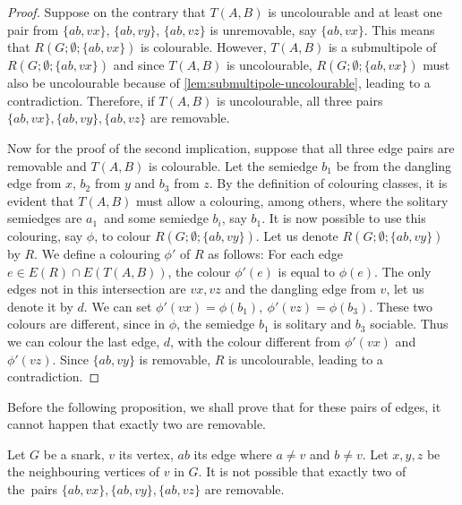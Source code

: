 \begin{proof}
	Suppose on the contrary that $T(A,B)$ is uncolourable and at least one pair from $\{ab,vx\}$, $\{ab,vy\}$, $\{ab,vz\}$ is unremovable, say $\{ab,vx\}$. This means that $R(G;\emptyset;\{ab,vx\})$ is colourable. However, $T(A,B)$ is a submultipole of $R(G;\emptyset;\{ab,vx\})$ and since $T(A,B)$ is uncolourable, $R(G;\emptyset;\{ab,vx\})$ must also be uncolourable because of \cref{lem:submultipole-uncolourable}, leading to a contradiction. Therefore, if $T(A,B)$ is uncolourable, all three pairs $\{ab,vx\}, \{ab,vy\}, \{ab,vz\}$ are removable.
	
	Now for the proof of the second implication, suppose that all three edge pairs are removable and $T(A,B)$ is colourable. Let the semiedge $b_1$ be from the dangling edge from $x$, $b_2$ from $y$ and $b_3$ from $z$. By the definition of colouring classes, it is evident that $T(A,B)$ must allow a colouring, among others, where the solitary semiedges are $a_1$~and some semiedge $b_i$, say $b_1$. It is now possible to use this colouring, say $\phi$, to colour $R(G;\emptyset;\{ab,vy\})$. Let us denote $R(G;\emptyset;\{ab,vy\})$ by $R$.
	We define a colouring $\phi'$ of $R$ as follows: For each edge $e\in E(R)\cap E(T(A,B))$, the colour $\phi'(e)$ is equal to $\phi(e)$. The only edges not in this intersection are $vx,vz$ and the dangling edge from $v$, let us denote it by $d$. We can set $\phi'(vx)=\phi(b_1),~\phi'(vz)=\phi(b_3)$. These two colours are different, since in $\phi$, the semiedge $b_1$ is solitary and $b_3$ sociable. Thus we can colour the last edge, $d$, with the colour different from $\phi'(vx)$ and $\phi'(vz)$. Since $\{ab,vy\}$ is removable, $R$ is uncolourable, leading to a contradiction.
\end{proof}

Before the following proposition, we shall prove that for these pairs of edges, it cannot happen that exactly two are removable.

\begin{lemma}
	Let $G$ be a snark, $v$ its vertex, $ab$ its edge where $a\neq v$ and $b \neq v$. Let $x,y,z$ be the neighbouring vertices of $v$ in $G$. It is not possible that exactly two of the~pairs $\{ab,vx\}, \{ab,vy\}, \{ab,vz\}$ are removable.
	\label{lem:not-2-removable}
\end{lemma}

